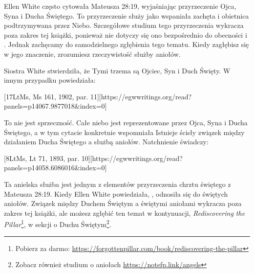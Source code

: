 Ellen White często cytowała Mateusza 28:19, wyjaśniając przyrzeczenie Ojca, Syna i Ducha Świętego. To przyrzeczenie służy jako wspaniała zachęta i obietnica podtrzymywana przez Niebo. Szczegółowe studium tego przyrzeczenia wykracza poza zakres tej książki, ponieważ nie dotyczy się ono bezpośrednio do obecności i . Jednak zachęcamy do samodzielnego zgłębienia tego tematu. Kiedy zagłębisz się w jego znaczenie, zrozumiesz rzeczywistość służby aniołów.

Siostra White stwierdziła, że  Tymi trzema są Ojciec, Syn i Duch Święty. W innym przypadku powiedziała:

[17LtMs, Ms 161, 1902, par. 11][https://egwwritings.org/read?panels=p14067.9877018&index=0]

To nie jest sprzeczność. Całe niebo jest reprezentowane przez Ojca, Syna i Ducha Świętego, a w tym cytacie konkretnie wspomniała  Istnieje ścisły związek między działaniem Ducha Świętego a służbą aniołów. Natchnienie świadczy:

[8LtMs, Lt 71, 1893, par. 10][https://egwwritings.org/read?panels=p14058.6086016&index=0]

Ta anielska służba jest jednym z elementów przyrzeczenia chrztu świętego z Mateusza 28:19. Kiedy Ellen White powiedziała, , odnosiła się do świętych aniołów. Związek między Duchem Świętym a świętymi aniołami wykracza poza zakres tej książki, ale możesz zgłębić ten temat w kontynuacji, \textit{Rediscovering the Pillar}\footnote{Pobierz za darmo: \href{https://forgottenpillar.com/book/rediscovering-the-pillar}{https://forgottenpillar.com/book/rediscovering-the-pillar}}, w sekcji o Duchu Świętym\footnote{Zobacz również studium o aniołach \href{https://notefp.link/angels}{https://notefp.link/angels}}.

